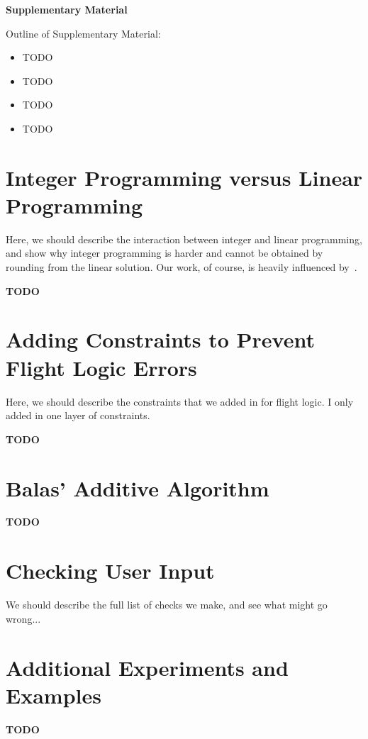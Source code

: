 \documentclass{article}
\begin{document}










\onecolumn

\appendix

\begin{center}
{\Large \textbf{Supplementary Material}}
\end{center}

Outline of Supplementary Material:

\begin{itemize}[noitemsep]
    \item TODO
    \item TODO
    \item TODO
    \item TODO
\end{itemize}


\section{Integer Programming versus Linear Programming}\label{app:lin_vs_int}

Here, we should describe the interaction between integer and linear programming, and show why integer programming is harder and cannot be obtained by
rounding from the linear solution. Our work, of course, is heavily influenced by~\cite{stevenmiller}.

{\bf TODO}

\section{Adding Constraints to Prevent Flight Logic Errors}\label{app:flight_logic}

Here, we should describe the constraints that we added in for flight logic. I only added in one layer of constraints.

{\bf TODO}

\section{Balas' Additive Algorithm}\label{app:balas}

{\bf TODO}

\section{Checking User Input}\label{app:input_check}

We should describe the full list of checks we make, and see what might go wrong...

\section{Additional Experiments and Examples}\label{app:additional_experiments_and_examples}

{\bf TODO}

\end{document}
